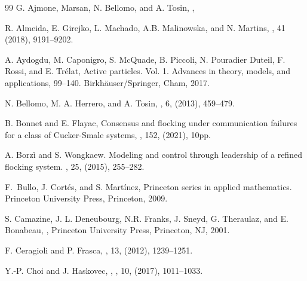 \documentclass[a4paper,11pt,oneside]{article}
\begin{document}
\begin{thebibliography}{99}
	G. Ajmone, Marsan, N.
	Bellomo, and A. Tosin,
	,
	
R. Almeida, E. Girejko, L. Machado, A.B. Malinowska, and N. Martins, 
, 41 (2018), 9191--9202.
	
A. Aydogdu, M. Caponigro, S. McQuade, B. Piccoli,
N. Pouradier Duteil, F. Rossi, and E. Tr\'elat,
\newblock Active particles. Vol. 1. Advances in theory, models, and applications, 99--140.
\newblock Birkh\"{a}user/Springer, Cham, 2017.

N. Bellomo, M. A. Herrero, and A. Tosin,
, 6, (2013), 459--479.


	B. Bonnet and E. Flayac,
	\newblock Consensus and flocking under communication failures for a class of Cucker-Smale systems,
	, 152, (2021), 10pp. 
	
	A. Borz\`i and S. Wongkaew.
	\newblock Modeling and control through leadership of a refined flocking system.
	, 25, (2015), 255--282.
	
	F.~Bullo, J. Cort\'es, and S. Mart\'inez,
	\newblock Princeton series in applied mathematics. Princeton University Press, Princeton, 2009.
	
	S. Camazine, J. L. Deneubourg, N.R. Franks, J. Sneyd,
	G. Theraulaz, and E. Bonabeau,
	, Princeton University Press, Princeton, NJ, 2001.

	
F. Ceragioli and P. Frasca,
,
 13, (2012), 1239--1251.
	
	{ Y.-P. Choi and J. Haskovec},
	,
	, 10, (2017), 1011--1033.
	

\end{thebibliography}
\end{document}
